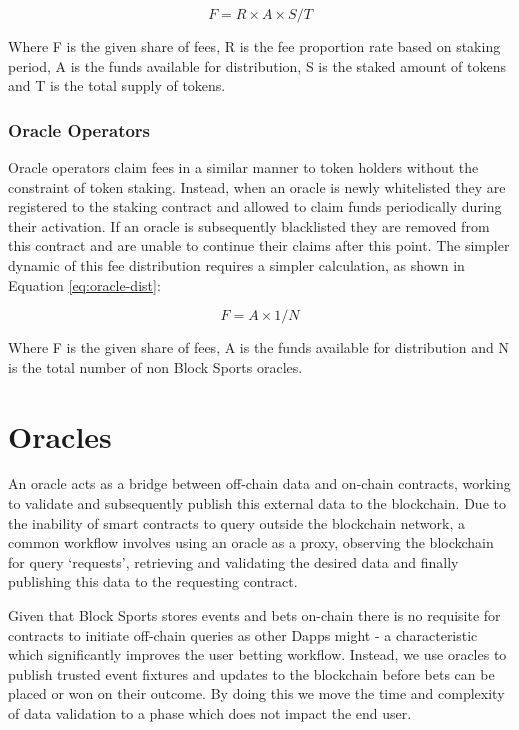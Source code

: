 \documentclass{article}
\begin{document}
\begin{equation}
F = R\times A\times S/T\label{eq:token-dist}
\end{equation}

Where F is the given share of fees, R is the fee proportion rate based on staking period, A is the funds available for distribution, S is the staked amount of tokens and T is the total supply of tokens.

		\subsubsection{Oracle Operators} \label{oracle-operators}
Oracle operators claim fees in a similar manner to token holders without the constraint of token staking. Instead, when an oracle is newly whitelisted they are registered to the staking contract and allowed to claim funds periodically during their activation. If an oracle is subsequently blacklisted they are removed from this contract and are unable to continue their claims after this point. The simpler dynamic of this fee distribution requires a simpler calculation, as shown in Equation \ref{eq:oracle-dist}:

\begin{equation}
F = A\times 1/N\label{eq:oracle-dist}
\end{equation}

Where F is the given share of fees, A is the funds available for distribution and N is the total number of non Block Sports oracles.

\section{Oracles} \label{oracles}
An oracle acts as a bridge between off-chain data and on-chain contracts, working to validate and subsequently publish this external data to the blockchain. Due to the inability of smart contracts to query outside the blockchain network, a common workflow involves using an oracle as a proxy, observing the blockchain for query ‘requests’, retrieving and validating the desired data and finally publishing this data to the requesting contract.

Given that Block Sports stores events and bets on-chain there is no requisite for contracts to initiate off-chain queries as other Dapps might - a characteristic which significantly improves the user betting workflow. Instead, we use oracles to publish trusted event fixtures and updates to the blockchain before bets can be placed or won on their outcome. By doing this we move the time and complexity of data validation to a phase which does not impact the end user.
\end{document}
